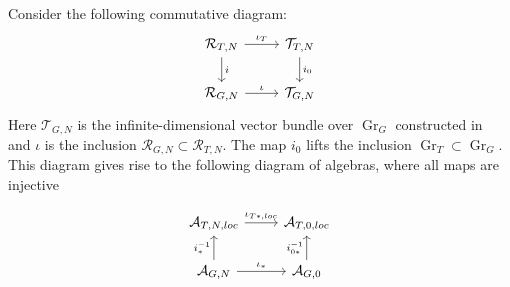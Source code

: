 \documentclass{article}
\newcommand{\mc}[1]{\mathcal{#1}}
\newcommand{\Gr}{\operatorname{Gr}}
\begin{document}
 Consider the following commutative diagram:
\[
\begin{tikzcd}
\mc{R}_{T,N} \ar[r,"\iota_T"]\ar[d,"i"] & \mc{T}_{T,N}\ar[d,"i_0"]\\
\mc{R}_{G,N} \ar[r,"\iota"] & \mc{T}_{G,N}
\end{tikzcd}
\]
Here $\mc{T}_{G,N}$ is the infinite-dimensional vector bundle over $\Gr_G$ constructed in~\cite{BFN} and $\iota$ is the inclusion $\mc{R}_{G,N}\subset \mc{R}_{T,N}$. The map $i_0$ lifts the inclusion $\Gr_T\subset\Gr_G$. This diagram gives rise to the following diagram of algebras, where all maps are injective

\begin{equation}
\label{EqDiagramOfALgebras}
\begin{tikzcd}
\mc{A}_{T,N,loc} \ar[r,"\iota_{T*,loc}"] & \mc{A}_{T,0,loc}\\
\mc{A}_{G,N}\ar[u,"i_*^{-1}"]\ar[r,"\iota_*"] & \mc{A}_{G,0}\ar[u,"i_{0*}^{-1}"]
\end{tikzcd}
\end{equation}
\end{document}
